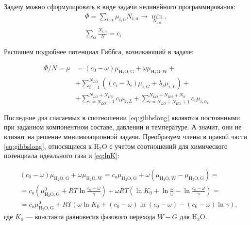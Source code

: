 \documentclass[12pt]{article}
\begin{document}
Задачу можно сформулировать в виде задачи нелинейного программирования:
\begin{equation}
\begin{aligned}
\Phi = \sum_{i, \alpha} \mu_{i, \alpha} N_{i, \alpha} \rightarrow \min_{N_{i, \alpha}},\\
\sum_\alpha \frac{N_{i, \alpha}}{N} = c_i
\end{aligned}
\label{eq:problem}
\end{equation}

Распишем подробнее потенциал Гиббса, возникающий в задаче:

\begin{equation}
\begin{aligned}
\Phi / N = \mu &= (c_0 - \omega) \mu_{\mathrm{H_2O, G}} + \omega \mu_{\mathrm{H_2O, W}} + \\
& + \sum_{i = 1}^{N_{LO}} \left((c_i - \lambda_i) \mu_{i, G} + \lambda_i \mu_{i, L}\right) + \\
& + \sum_{i = N_{LO} + 1}^{N_{LO} + N_{HO}} c_i \mu_{i, L} + \sum_{i = N_{LO} + N_{HO}+ 1}^{N_{LO} + N_{HO} + N_{S}} c_i \mu_{i, \alpha_i}
\end{aligned}
\label{eq:gibbslong}
\end{equation}

Последние два слагаемых в соотношении \eqref{eq:gibbslong} являются постоянными при заданном компонентном составе, давлении и температуре. А значит, они не влияют на решение минимизационной задачи. Преобразуем члены в правой части \eqref{eq:gibbslong}, относящиеся к $\mathrm{H_2O}$ с учетом соотношений для химического потенциала идеального газа и \eqref{eq:lnK}:

\begin{equation}
\begin{aligned}
& (c_0 - \omega) \mu_{\mathrm{H_2O, G}} + \omega \mu_{\mathrm{H_2O, W}} = c_o \mu_{\mathrm{H_2O, G}} + \omega (\mu_{\mathrm{H_2O, W}} - \mu_{\mathrm{H_2O, G}}) = \\
& = c_o \left(\mu_{\mathrm{H_2O, G}}^{0} + RT \ln \frac{c_0 - \omega}{\gamma}\right) + \omega RT \left(\ln K_0 + \ln \frac{\omega}{\omega} - \ln \frac{c_0 - \omega}{\gamma}\right) = \\
& = c_o \mu_{\mathrm{H_2O, G}}^{0} + RT \left(\omega \ln K_0 + (c_0 - \omega) \ln (c_0 - \omega) - (c_0 - \omega) \ln \gamma\right),
\end{aligned}
\label{eq:gibbswater}
\end{equation}
где $K_0$ --- константа равновесия фазового перехода $W-G$ для $\mathrm{H_2O}$.
\end{document}
